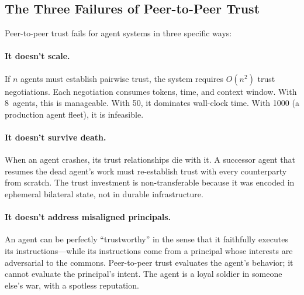 \documentclass[11pt,a4paper]{article}
\theoremstyle{definition}
\theoremstyle{remark}
\begin{document}
\subsection{The Three Failures of Peer-to-Peer Trust}
Peer-to-peer trust fails for agent systems in three specific ways:
\paragraph{It doesn't scale.} If $n$ agents must establish pairwise trust, the system requires $O(n^2)$ trust negotiations. Each negotiation consumes tokens, time, and context window. With 8~agents, this is manageable. With 50, it dominates wall-clock time. With 1000 (a production agent fleet), it is infeasible.
\paragraph{It doesn't survive death.} When an agent crashes, its trust relationships die with it. A successor agent that resumes the dead agent's work must re-establish trust with every counterparty from scratch. The trust investment is non-transferable because it was encoded in ephemeral bilateral state, not in durable infrastructure.
\paragraph{It doesn't address misaligned principals.} An agent can be perfectly ``trustworthy'' in the sense that it faithfully executes its instructions---while its instructions come from a principal whose interests are adversarial to the commons. Peer-to-peer trust evaluates the agent's behavior; it cannot evaluate the principal's intent. The agent is a loyal soldier in someone else's war, with a spotless reputation.
\end{document}
